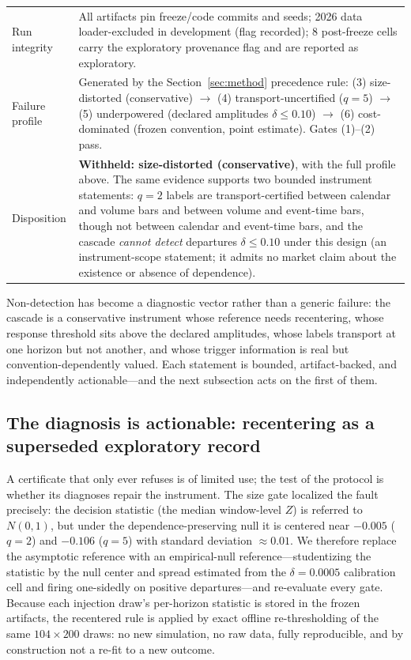 \documentclass[3p]{elsarticle}
\begin{document}
\begin{table}[htbp]
\begin{threeparttable}
\begin{tabularx}{\textwidth}{@{}lX@{}}
Run integrity & All artifacts pin freeze/code commits and seeds; 2026 data loader-excluded in development (flag recorded); 8 post-freeze cells carry the exploratory provenance flag and are reported as exploratory. \\
Failure profile & Generated by the Section~\ref{sec:method} precedence rule: (3) size-distorted (conservative) $\rightarrow$ (4) transport-uncertified ($q{=}5$) $\rightarrow$ (5) underpowered (declared amplitudes $\delta\le0.10$) $\rightarrow$ (6) cost-dominated (frozen convention, point estimate). Gates (1)--(2) pass. \\
Disposition & \textbf{Withheld: size-distorted (conservative)}, with the full profile above. The same evidence supports two bounded instrument statements: $q{=}2$ labels are transport-certified between calendar and volume bars and between volume and event-time bars, though not between calendar and event-time bars, and the cascade \emph{cannot detect} departures $\delta\le0.10$ under this design (an instrument-scope statement; it admits no market claim about the existence or absence of dependence). \\
\bottomrule
\end{tabularx}
\end{threeparttable}
\end{table}

Non-detection has become a diagnostic vector rather than a generic failure:
the cascade is a conservative instrument whose reference needs recentering,
whose response threshold sits above the declared amplitudes, whose labels
transport at one horizon but not another, and whose trigger information is
real but convention-dependently valued. Each statement is bounded,
artifact-backed, and independently actionable---and the next subsection acts
on the first of them.

\subsection{The diagnosis is actionable: recentering as a superseded exploratory record}
\label{sec:repair}

A certificate that only ever refuses is of limited use; the test of the
protocol is whether its diagnoses repair the instrument. The size gate
localized the fault precisely: the decision statistic (the median window-level
$Z$) is referred to $N(0,1)$, but under the dependence-preserving null it is
centered near $-0.005$ ($q{=}2$) and $-0.106$ ($q{=}5$) with standard
deviation $\approx0.01$. We therefore replace the asymptotic reference with
an empirical-null reference---studentizing the statistic by the null center
and spread estimated from the $\delta\!=\!0.0005$ calibration cell and firing
one-sidedly on positive departures---and re-evaluate every gate. Because each
injection draw's per-horizon statistic is stored in the frozen artifacts, the
recentered rule is applied by exact offline re-thresholding of the same
$104\times200$ draws: no new simulation, no raw data, fully reproducible, and
by construction not a re-fit to a new outcome.
\end{document}
